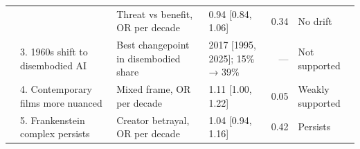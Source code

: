 \begin{table}[htbp]
\begin{tabular}{llllrl}
 &  & Threat vs benefit, OR per decade & 0.94 [0.84, 1.06] & 0.34 & No drift \\
 & 3. 1960s shift to disembodied AI & Best changepoint in disembodied share & 2017 [1995, 2025]; 15\% → 39\% & — & Not supported \\
 & 4. Contemporary films more nuanced & Mixed frame, OR per decade & 1.11 [1.00, 1.22] & 0.05 & Weakly supported \\
 & 5. Frankenstein complex persists & Creator betrayal, OR per decade & 1.04 [0.94, 1.16] & 0.42 & Persists \\
\bottomrule
\end{tabular}
\end{table}
